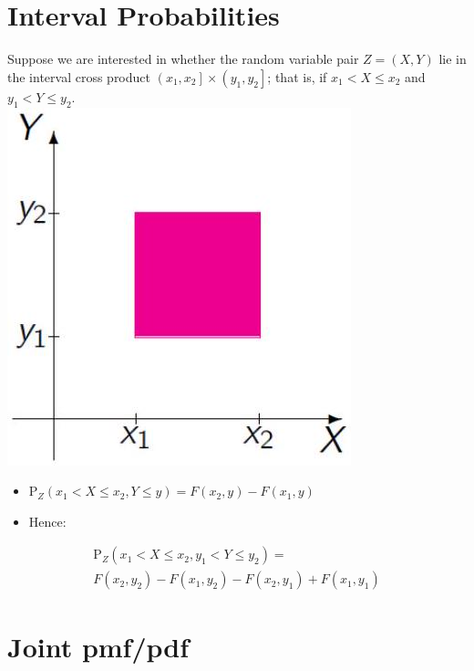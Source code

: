 \documentclass[10pt]{article}
\begin{document}
\section*{Interval Probabilities}
Suppose we are interested in whether the random variable pair $Z=(X, Y)$ lie in the interval cross product $\left(x_{1}, x_{2}\right] \times\left(y_{1}, y_{2}\right]$; that is, if $x_{1}<X \leq x_{2}$ and $y_{1}<Y \leq y_{2}$.\\
\includegraphics[max width=\textwidth, center]{2025_05_11_84d245f69223a25e0522g-07}

\begin{itemize}
  \item $\mathrm{P}_{Z}\left(x_{1}<X \leq x_{2}, Y \leq y\right)=F\left(x_{2}, y\right)-F\left(x_{1}, y\right)$
  \item Hence:
\end{itemize}

$$
\begin{gathered}
\mathrm{P}_{Z}\left(x_{1}<X \leq x_{2}, y_{1}<Y \leq y_{2}\right)= \\
F\left(x_{2}, y_{2}\right)-F\left(x_{1}, y_{2}\right)-F\left(x_{2}, y_{1}\right)+F\left(x_{1}, y_{1}\right)
\end{gathered}
$$

\section*{Joint pmf/pdf}
\end{document}
